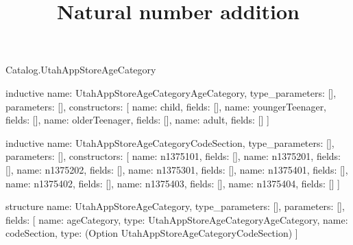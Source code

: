 \begin{lexlean}{Catalog.UtahAppStoreAgeCategory}
\title{Natural number addition}
\begin{semanticmodule}
inductive{
  name: UtahAppStoreAgeCategoryAgeCategory,
  type_parameters: [],
  parameters: [],
  constructors: [
    {name: child, fields: []},
    {name: youngerTeenager, fields: []},
    {name: olderTeenager, fields: []},
    {name: adult, fields: []}
  ]
}

inductive{
  name: UtahAppStoreAgeCategoryCodeSection,
  type_parameters: [],
  parameters: [],
  constructors: [
    {name: n1375101, fields: []},
    {name: n1375201, fields: []},
    {name: n1375202, fields: []},
    {name: n1375301, fields: []},
    {name: n1375401, fields: []},
    {name: n1375402, fields: []},
    {name: n1375403, fields: []},
    {name: n1375404, fields: []}
  ]
}

structure{
  name: UtahAppStoreAgeCategory,
  type_parameters: [],
  parameters: [],
  fields: [
    {name: ageCategory, type: UtahAppStoreAgeCategoryAgeCategory},
    {name: codeSection, type: (Option UtahAppStoreAgeCategoryCodeSection)}
  ]
}
\end{semanticmodule}
\end{lexlean}
